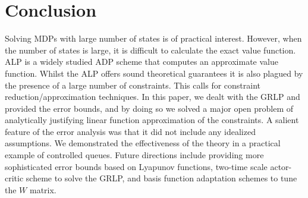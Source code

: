 \FloatBarrier
\begin{table}[H]
\caption{Shows performance metrics for $Q_L$.}%
\label{pref}
\end{table}
\section{Conclusion}
Solving MDPs with large number of states is of practical interest. However, when the number of states is large, it is difficult to calculate the exact value function. ALP is a widely studied ADP scheme that computes an approximate value function. Whilst the ALP offers sound theoretical guarantees it is also plagued by the presence of a large number of constraints. This calls for constraint reduction/approximation techniques. In this paper, we dealt with the GRLP and provided the error bounds, and by doing so we solved a major open problem of analytically justifying linear function approximation of the constraints. A salient feature of the error analysis was that it did not include any idealized assumptions. We demonstrated the effectiveness of the theory in a practical example of controlled queues. Future directions include providing more sophisticated error bounds based on Lyapunov functions, two-time scale actor-critic scheme to solve the GRLP, and basis function adaptation schemes to tune the $W$ matrix.

\begin{comment}
\textbf{Lyapunov Functions:}
The error bounds are in terms of $||J^*-\Phi r^*||_\infty$ and $||\Gamma \bj-\tg\bj||_\infty$ and it can be argued that the basis functions might not approximate $J^*$ uniformly over all the states. This problem can be alleviated easily by making use of Lyapunov functions as in \cite{ALP} and showing that the operators $\Gamma$ and $\tg$ are contraction maps in a modified $L_\infty$ norm. %
\end{comment}

